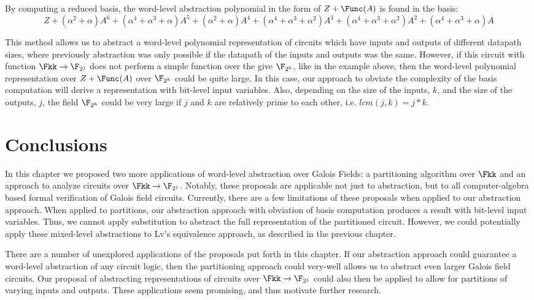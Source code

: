 \begin{Example}
By computing a reduced \Grobner basis, the word-level abstraction polynomial
in the form of $Z+\Func(A)$ is found in the basis:
\begin{equation}
Z+(\alpha^2+\alpha)A^6+(\alpha^4+\alpha^3+\alpha)A^5+(\alpha^2+\alpha)A^4+(\alpha^4+\alpha^3+\alpha^2)A^3+(\alpha^4+\alpha^3+\alpha^2)A^2+(\alpha^4+\alpha^3+\alpha)A \nonumber
\end{equation}
\end{Example}


This method allows us to abstract a word-level polynomial representation
of circuits which have inputs and outputs of different datapath sizes, where
previously abstraction was only possible if the datapath of the inputs and
outputs was the same.
However, if this circuit with function $\Fkk \rightarrow \F_{2^j}$ does not 
perform a
simple function over the give $\F_{2^h}$, like in the example above, then 
the word-level polynomial representation over $Z+\Func(A)$ over $\F_{2^h}$ 
could be quite large. In this case, our approach to obviate the complexity
of the \Grobner basis computation will derive a representation with bit-level
input variables.
Also, depending on the size of the inputs, $k$, and the 
size of the outputs, $j$, the field $\F_{2^h}$ could be very large if $j$ and
$k$ are relatively prime to each other, i.e. $lcm(j,k)=j*k$.

\section{Conclusions}

In this chapter we proposed two more applications of word-level abstraction 
over Galois Fields: a partitioning algorithm over $\Fkk$ and an approach to
analyze circuits over $\Fkk \rightarrow \F_{2^j}$.
Notably, these proposals are applicable not just to 
abstraction, but to all computer-algebra based formal verification of Galois 
field circuits. Currently, there are a few limitations of these proposals 
when applied to our abstraction approach. When applied to partitions, our 
abstraction approach with obviation of \Grobner basis computation produces a 
result with bit-level input variables. Thus, we cannot apply substitution to
abstract the full representation of the partitioned circuit. However, 
we could potentially apply these mixed-level abstractions to Lv's
equivalence approach, as described in the previous chapter.

There are a number of unexplored applications of the proposals put forth in 
this chapter. If our abstraction approach could guarantee a word-level 
abstraction of any circuit logic, then the partitioning approach could 
very-well allows us to abstract even larger Galois field circuits. Our 
proposal of abstracting representations of circuits over 
$\Fkk \rightarrow \F_{2^j}$ could also then be applied to allow for 
partitions of varying inputs and outputs. These applications seem 
promising, and thus motivate further research.
